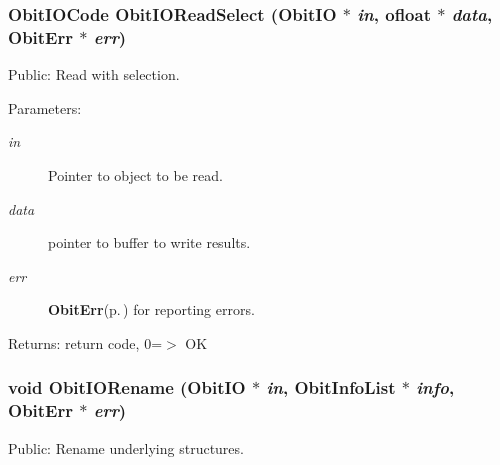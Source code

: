 \subsubsection{\setlength{\rightskip}{0pt plus 5cm}Obit\-IOCode Obit\-IORead\-Select ({\bf Obit\-IO} $\ast$ {\em in}, {\bf ofloat} $\ast$ {\em data}, {\bf Obit\-Err} $\ast$ {\em err})}\label{ObitIO_8h_a41}


Public: Read with selection. 

\begin{Desc}
\item[Parameters:]
\begin{description}
\item[{\em in}]Pointer to object to be read. \item[{\em data}]pointer to buffer to write results. \item[{\em err}]{\bf Obit\-Err}{\rm (p.\,\pageref{structObitErr})} for reporting errors. \end{description}
\end{Desc}
\begin{Desc}
\item[Returns:]return code, 0=$>$ OK \end{Desc}
\subsubsection{\setlength{\rightskip}{0pt plus 5cm}void Obit\-IORename ({\bf Obit\-IO} $\ast$ {\em in}, {\bf Obit\-Info\-List} $\ast$ {\em info}, {\bf Obit\-Err} $\ast$ {\em err})}\label{ObitIO_8h_a32}


Public: Rename underlying structures. 

